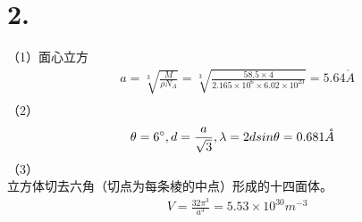 \documentclass[UTF8]{ctexart}
\begin{document}
\section*{2.}
（1）面心立方
\begin{equation*}
    \begin{aligned}
        & a=\sqrt[3]{\frac{M}{\rho N_A}}=\sqrt[3]{\frac{58.5\times4}{2.165\times10^6\times6.02\times10^{23}}}=5.64\mathring{A}\\
    \end{aligned}
\end{equation*}
（2）
\begin{equation*}
    \begin{aligned}
        & \theta = 6\degree, d = \frac{a}{\sqrt3}, \lambda = 2dsin\theta = 0.681\mathring{A}\\
    \end{aligned}
\end{equation*}
（3）\\
立方体切去六角（切点为每条棱的中点）形成的十四面体。
\begin{equation*}
    \begin{aligned}
        & V = \frac{32\pi^3}{a^3} = 5.53\times10^{30}m^{-3}\\
    \end{aligned}
\end{equation*}
\end{document}
